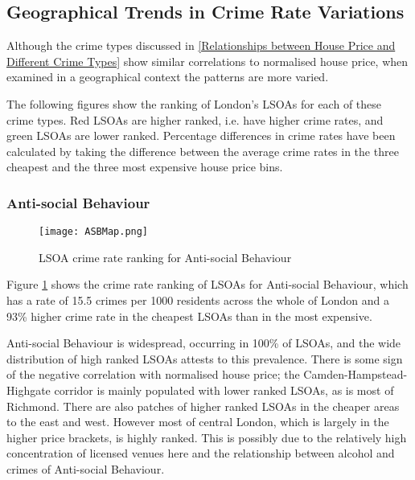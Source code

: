 \documentclass{article}
\begin{document}
\subsection{Geographical Trends in Crime Rate Variations}

Although the crime types discussed in \ref{Relationships between House Price and Different Crime Types} show similar correlations to normalised house price, when examined in a geographical context the patterns are more varied.

The following figures show the ranking of London's LSOAs for each of these crime types. Red LSOAs are higher ranked, i.e. have higher crime rates, and green LSOAs are lower ranked. Percentage differences in crime rates have been calculated by taking the difference between the average crime rates in the three cheapest and the three most expensive house price bins.

\subsubsection{Anti-social Behaviour}
\begin{figure}[H]
\begin{center}
  \texttt{[image: ASBMap.png]}
  \caption{LSOA crime rate ranking for Anti-social Behaviour}
  \label{fig:ASBMap}
\end{center}
\end{figure}

Figure \ref{fig:ASBMap} shows the crime rate ranking of LSOAs for Anti-social Behaviour, which has a rate of 15.5 crimes per 1000 residents across the whole of London and a 93\% higher crime rate in the cheapest LSOAs than in the most expensive.
\newline 

Anti-social Behaviour is widespread, occurring in 100\% of LSOAs, and the wide distribution of high ranked LSOAs attests to this prevalence. There is some sign of the negative correlation with normalised house price; the Camden-Hampstead-Highgate corridor is mainly populated with lower ranked LSOAs, as is most of Richmond. There are also patches of higher ranked LSOAs in the cheaper areas to the east and west. However most of central London, which is largely in the higher price brackets, is highly ranked. This is possibly due to the relatively high concentration of licensed venues here and the relationship between alcohol and crimes of Anti-social Behaviour.
\newline
\end{document}
